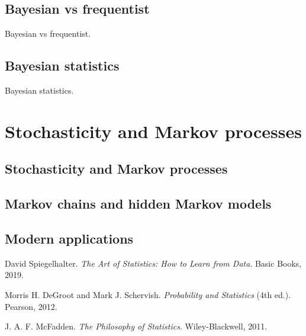 \documentclass{book}
\begin{document}
\section{Bayesian vs frequentist}
Bayesian vs frequentist.

\section{Bayesian statistics}
Bayesian statistics.


\chapter{Stochasticity and Markov processes}

\section{Stochasticity and Markov processes}

\section{Markov chains and hidden Markov models}

\section{Modern applications}


\backmatter
 
\begin{thebibliography}{999}

David Spiegelhalter. 
\textit{The Art of Statistics: How to Learn from Data}. 
Basic Books, 2019.

Morris H. DeGroot and Mark J. Schervish.
\textit{Probability and Statistics} (4th ed.).
Pearson, 2012.

J. A. F. McFadden.
\textit{The Philosophy of Statistics}.
Wiley-Blackwell, 2011.

\end{thebibliography}
\end{document}
